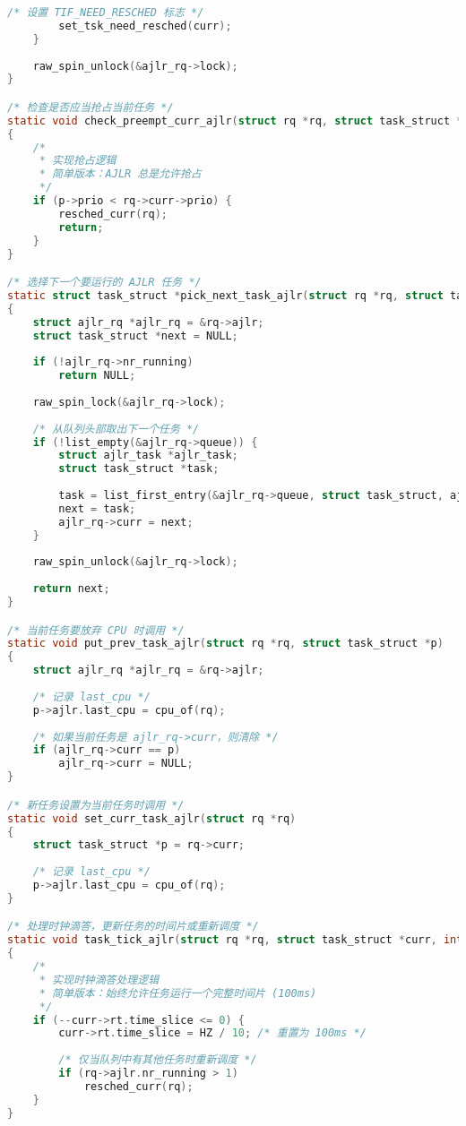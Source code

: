 \documentclass[a4paper,12pt]{article}
\begin{document}
\begin{lstlisting}[language=C]
        /* 设置 TIF_NEED_RESCHED 标志 */
        set_tsk_need_resched(curr);
    }
    
    raw_spin_unlock(&ajlr_rq->lock);
}

/* 检查是否应当抢占当前任务 */
static void check_preempt_curr_ajlr(struct rq *rq, struct task_struct *p, int flags)
{
    /* 
     * 实现抢占逻辑
     * 简单版本：AJLR 总是允许抢占
     */
    if (p->prio < rq->curr->prio) {
        resched_curr(rq);
        return;
    }
}

/* 选择下一个要运行的 AJLR 任务 */
static struct task_struct *pick_next_task_ajlr(struct rq *rq, struct task_struct *prev, struct rq_flags *rf)
{
    struct ajlr_rq *ajlr_rq = &rq->ajlr;
    struct task_struct *next = NULL;
    
    if (!ajlr_rq->nr_running)
        return NULL;
    
    raw_spin_lock(&ajlr_rq->lock);
    
    /* 从队列头部取出下一个任务 */
    if (!list_empty(&ajlr_rq->queue)) {
        struct ajlr_task *ajlr_task;
        struct task_struct *task;
        
        task = list_first_entry(&ajlr_rq->queue, struct task_struct, ajlr.run_node);
        next = task;
        ajlr_rq->curr = next;
    }
    
    raw_spin_unlock(&ajlr_rq->lock);
    
    return next;
}

/* 当前任务要放弃 CPU 时调用 */
static void put_prev_task_ajlr(struct rq *rq, struct task_struct *p)
{
    struct ajlr_rq *ajlr_rq = &rq->ajlr;
    
    /* 记录 last_cpu */
    p->ajlr.last_cpu = cpu_of(rq);
    
    /* 如果当前任务是 ajlr_rq->curr，则清除 */
    if (ajlr_rq->curr == p)
        ajlr_rq->curr = NULL;
}

/* 新任务设置为当前任务时调用 */
static void set_curr_task_ajlr(struct rq *rq)
{
    struct task_struct *p = rq->curr;
    
    /* 记录 last_cpu */
    p->ajlr.last_cpu = cpu_of(rq);
}

/* 处理时钟滴答，更新任务的时间片或重新调度 */
static void task_tick_ajlr(struct rq *rq, struct task_struct *curr, int queued)
{
    /* 
     * 实现时钟滴答处理逻辑
     * 简单版本：始终允许任务运行一个完整时间片 (100ms)
     */
    if (--curr->rt.time_slice <= 0) {
        curr->rt.time_slice = HZ / 10; /* 重置为 100ms */
        
        /* 仅当队列中有其他任务时重新调度 */
        if (rq->ajlr.nr_running > 1)
            resched_curr(rq);
    }
}
\end{lstlisting}
\end{document}
